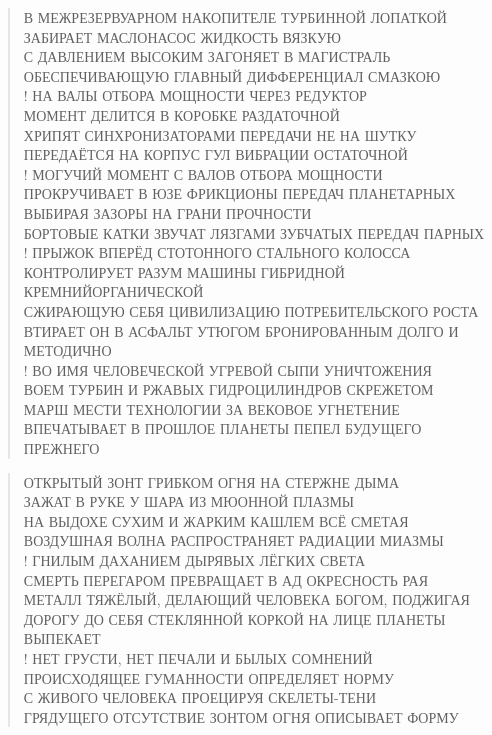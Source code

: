 \poemtitle{***}
\begin{verse}
В МЕЖРЕЗЕРВУАРНОМ НАКОПИТЕЛЕ ТУРБИННОЙ ЛОПАТКОЙ\\
ЗАБИРАЕТ МАСЛОНАСОС ЖИДКОСТЬ ВЯЗКУЮ \\
С ДАВЛЕНИЕМ ВЫСОКИМ ЗАГОНЯЕТ В МАГИСТРАЛЬ\\
ОБЕСПЕЧИВАЮЩУЮ ГЛАВНЫЙ ДИФФЕРЕНЦИАЛ СМАЗКОЮ\\!
НА ВАЛЫ ОТБОРА МОЩНОСТИ ЧЕРЕЗ РЕДУКТОР\\
МОМЕНТ ДЕЛИТСЯ В КОРОБКЕ РАЗДАТОЧНОЙ\\
ХРИПЯТ СИНХРОНИЗАТОРАМИ ПЕРЕДАЧИ НЕ  НА ШУТКУ\\
ПЕРЕДАЁТСЯ НА КОРПУС ГУЛ ВИБРАЦИИ ОСТАТОЧНОЙ\\!
МОГУЧИЙ МОМЕНТ С ВАЛОВ ОТБОРА МОЩНОСТИ\\
ПРОКРУЧИВАЕТ В ЮЗЕ ФРИКЦИОНЫ ПЕРЕДАЧ ПЛАНЕТАРНЫХ\\
ВЫБИРАЯ ЗАЗОРЫ НА ГРАНИ ПРОЧНОСТИ\\
БОРТОВЫЕ КАТКИ ЗВУЧАТ ЛЯЗГАМИ ЗУБЧАТЫХ ПЕРЕДАЧ ПАРНЫХ\\!
ПРЫЖОК ВПЕРЁД СТОТОННОГО СТАЛЬНОГО КОЛОССА\\
КОНТРОЛИРУЕТ РАЗУМ МАШИНЫ ГИБРИДНОЙ КРЕМНИЙОРГАНИЧЕСКОЙ\\
СЖИРАЮЩУЮ СЕБЯ ЦИВИЛИЗАЦИЮ ПОТРЕБИТЕЛЬСКОГО РОСТА\\
ВТИРАЕТ ОН В АСФАЛЬТ УТЮГОМ БРОНИРОВАННЫМ ДОЛГО И МЕТОДИЧНО\\!
ВО ИМЯ ЧЕЛОВЕЧЕСКОЙ УГРЕВОЙ СЫПИ УНИЧТОЖЕНИЯ\\
ВОЕМ ТУРБИН И РЖАВЫХ ГИДРОЦИЛИНДРОВ СКРЕЖЕТОМ\\
МАРШ МЕСТИ ТЕХНОЛОГИИ ЗА ВЕКОВОЕ УГНЕТЕНИЕ \\
ВПЕЧАТЫВАЕТ В ПРОШЛОЕ ПЛАНЕТЫ ПЕПЕЛ БУДУЩЕГО ПРЕЖНЕГО
\end{verse}

\poemtitle{***}
\begin{verse}
ОТКРЫТЫЙ ЗОНТ ГРИБКОМ ОГНЯ НА СТЕРЖНЕ ДЫМА\\
ЗАЖАТ В РУКЕ У ШАРА ИЗ МЮОННОЙ ПЛАЗМЫ\\
НА ВЫДОХЕ СУХИМ И ЖАРКИМ КАШЛЕМ ВСЁ СМЕТАЯ\\
ВОЗДУШНАЯ ВОЛНА РАСПРОСТРАНЯЕТ РАДИАЦИИ МИАЗМЫ\\!
ГНИЛЫМ ДАХАНИЕМ ДЫРЯВЫХ ЛЁГКИХ СВЕТА\\
СМЕРТЬ ПЕРЕГАРОМ ПРЕВРАЩАЕТ В АД ОКРЕСНОСТЬ РАЯ\\
МЕТАЛЛ ТЯЖЁЛЫЙ, ДЕЛАЮЩИЙ ЧЕЛОВЕКА БОГОМ, ПОДЖИГАЯ\\
ДОРОГУ ДО СЕБЯ СТЕКЛЯННОЙ КОРКОЙ НА ЛИЦЕ ПЛАНЕТЫ ВЫПЕКАЕТ\\!
НЕТ ГРУСТИ, НЕТ ПЕЧАЛИ И БЫЛЫХ СОМНЕНИЙ\\
ПРОИСХОДЯЩЕЕ ГУМАННОСТИ ОПРЕДЕЛЯЕТ НОРМУ\\
С ЖИВОГО ЧЕЛОВЕКА ПРОЕЦИРУЯ СКЕЛЕТЫ-ТЕНИ\\
ГРЯДУЩЕГО ОТСУТСТВИЕ ЗОНТОМ ОГНЯ ОПИСЫВАЕТ ФОРМУ
\end{verse}

